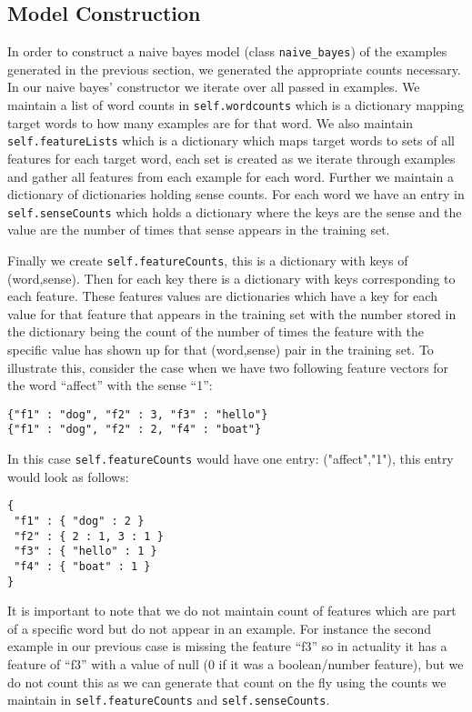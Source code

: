 \documentclass{article}
\begin{document}
\subsection{Model Construction}
In order to construct a naive bayes model (class \texttt{naive\_bayes}) of the examples generated in the previous section, we generated the appropriate counts necessary. In our naive bayes' constructor we iterate over all passed in examples. We maintain a list of word counts in \texttt{self.wordcounts} which is a dictionary mapping target words to how many examples are for that word. We also maintain \texttt{self.featureLists} which is a dictionary which maps target words to sets of all features for each target word, each set is created as we iterate through examples and gather all features from each example for each word. Further we maintain a dictionary of dictionaries holding sense counts. For each word we have an entry in \texttt{self.senseCounts} which holds a dictionary where the keys are the sense and the value are the number of times that sense appears in the training set. 

Finally we create \texttt{self.featureCounts}, this is a dictionary with keys of (word,sense). Then for each key there is a dictionary with keys corresponding to each feature. These features values are dictionaries which have a key for each value for that feature that appears in the training set with the number stored in the dictionary being the count of the number of times the feature with the specific value has shown up for that (word,sense) pair in the training set. To illustrate this, consider the case when we have two following feature vectors for the word ``affect'' with the sense ``1'':
{\small
\begin{verbatim}
{"f1" : "dog", "f2" : 3, "f3" : "hello"}
{"f1" : "dog", "f2" : 2, "f4" : "boat"}
\end{verbatim}
}
In this case \texttt{self.featureCounts} would have one entry: ("affect","1"), this entry would look as follows:
{\small
\begin{verbatim}
{
 "f1" : { "dog" : 2 }
 "f2" : { 2 : 1, 3 : 1 }
 "f3" : { "hello" : 1 }
 "f4" : { "boat" : 1 }
}
\end{verbatim}
}

It is important to note that we do not maintain count of features which are part of a specific word but do not appear in an example. For instance the second example in our previous case is missing the feature ``f3'' so in actuality it has a feature of ``f3'' with a value of null (0 if it was a boolean/number feature), but we do not count this as we can generate that count on the fly using the counts we maintain in \texttt{self.featureCounts} and \texttt{self.senseCounts}.
\end{document}
